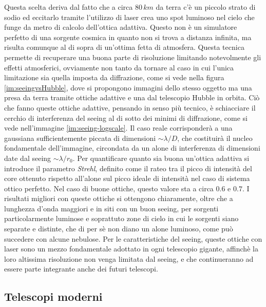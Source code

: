 Questa scelta deriva dal fatto che a circa $80\, km$ da terra c'è un piccolo strato di sodio ed eccitarlo tramite l'utilizzo di laser crea uno spot luminoso nel cielo che funge da metro di calcolo dell'ottica adattiva. Questo non è un simulatore perfetto di una sorgente cosmica in quanto non si trova a distanza infinita, ma risulta comunque al di sopra di un'ottima fetta di atmosfera. Questa tecnica permette di recuperare una buona parte di risoluzione limitando notevolmente gli effetti atmosferici, ovviamente non tanto da tornare al caso in cui l'unica limitazione sia quella imposta da diffrazione, come si vede nella figura \ref{im:seeingvsHubble}, dove si propongono immagini dello stesso oggetto ma una presa da terra tramite ottiche adattive e una dal telescopio Hubble in orbita. Ciò che fanno queste ottiche adattive, pensando in senso più tecnico, è schiacciare il cerchio di interferenza del seeing al di sotto dei minimi di diffrazione, come si vede nell'immagine \ref{im:seeing-logscale}. Il caso reale corrisponderà a una gaussiana sufficientemente piccata di dimensioni $\sim \lambda/D$, che costituirà il nucleo fondamentale dell'immagine, circondata da un alone di interferenza di dimensioni date dal seeing $\sim \lambda/r_0$. Per quantificare quanto sia buona un'ottica adattiva si introduce il parametro \textit{Strehl}, definito come il rateo tra il picco di intensità del core ottenuto rispetto all'alone sul picco ideale di intensità nel caso di sistema ottico perfetto. Nel caso di buone ottiche, questo valore sta a circa $0.6$ e $0.7$. I risultati migliori con queste ottiche si ottengono chiaramente, oltre che a lunghezza d'onda maggiori e in siti con un buon seeing, per sorgenti particolarmente luminose e soprattuto zone di cielo in cui le sorgenti siano separate e distinte, che di per sè non diano un alone luminoso, come può succedere con alcune nebulose. Per le caratteristiche del seeing, queste ottiche con laser sono un mezzo fondamentale adottato in ogni telescopio gigante, affinchè la loro altissima risoluzione non venga limitata dal seeing, e che continueranno ad essere parte integrante anche dei futuri telescopi.

\subsection*{Telescopi moderni}

